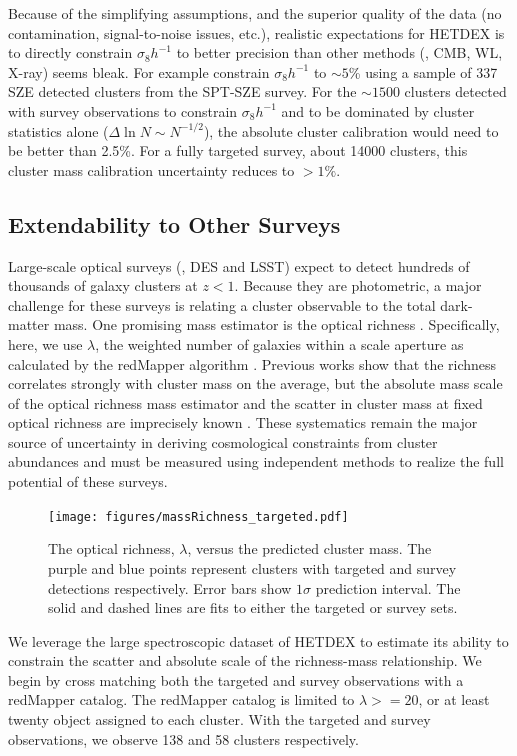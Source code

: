 \documentclass[fleqn,usenatbib]{mnras}
\begin{document}
Because of the simplifying assumptions, and the superior quality of the data (no contamination, signal-to-noise issues, etc.), realistic expectations for HETDEX is to directly constrain $\sigma_8h^{-1}$ to better precision than other methods (\eg, CMB, WL, X-ray) seems bleak. For example \cite{deHaan2016} constrain $\sigma_8h^{-1}$ to $\sim5$\% using a sample of 337 SZE detected clusters from the SPT-SZE survey. For the $\sim1500$ clusters detected with survey observations to constrain $\sigma_8h^{-1}$ and to be dominated by cluster statistics alone ($\Delta \ln N \sim N^{-1/2}$), the absolute cluster calibration would need to be better than 2.5\%. For a fully targeted survey, about 14000 clusters, this cluster mass calibration uncertainty reduces to $>1\%$.

\subsection{Extendability to Other Surveys}
Large-scale optical surveys (\eg, DES and LSST) expect to detect hundreds of thousands of galaxy clusters at $z < 1$. Because they are photometric, a major challenge for these surveys is relating a cluster observable to the total dark-matter mass. One promising mass estimator is the optical richness . Specifically, here, we use $\lambda$, the weighted number of galaxies within a scale aperture  as calculated by the redMapper algorithm \citep{Rykoff2012}. Previous works  show that the richness correlates strongly with cluster mass on the average, but the absolute mass scale of the optical richness mass estimator and the scatter in cluster mass at fixed optical richness are imprecisely known \citep{Rykoff2012}. These systematics remain the major source of uncertainty in deriving cosmological constraints from cluster abundances and must be measured using independent methods to realize the full potential of these surveys.

\begin{figure} 
	\texttt{[image: figures/massRichness\_targeted.pdf]} 
	\caption{The optical richness, $\lambda$, versus the predicted cluster mass. The purple and blue points represent clusters with targeted and survey detections respectively. Error bars show $1\sigma$ prediction interval. The solid and dashed lines are fits to either the targeted or survey sets. } \label{fig:mass richness} 
\end{figure}

We leverage the large spectroscopic dataset of HETDEX to estimate its ability to constrain the scatter and absolute scale of the richness-mass relationship. We begin by cross matching both the targeted and survey observations with a redMapper catalog. The redMapper catalog is limited to $\lambda >= 20$, or at least twenty object assigned to each cluster. With the targeted and survey observations, we observe 138 and 58 clusters respectively. 
\end{document}
